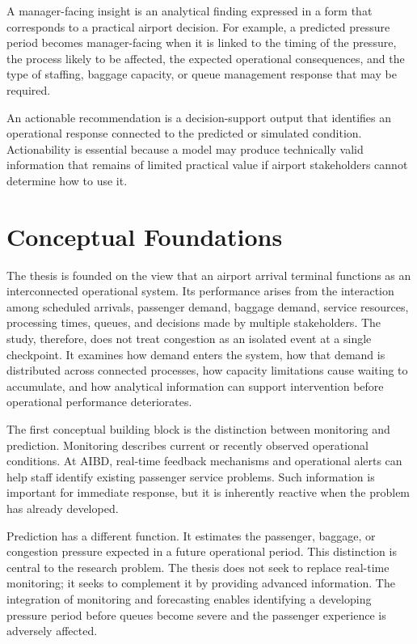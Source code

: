 A manager-facing insight is an analytical finding expressed in a form that corresponds to a practical airport decision. For example, a predicted pressure period becomes manager-facing when it is linked to the timing of the pressure, the process likely to be affected, the expected operational consequences, and the type of staffing, baggage capacity, or queue management response that may be required.

An actionable recommendation is a decision-support output that identifies an operational response connected to the predicted or simulated condition. Actionability is essential because a model may produce technically valid information that remains of limited practical value if airport stakeholders cannot determine how to use it.

\section{Conceptual Foundations}
\label{sec:conceptual-foundations}

The thesis is founded on the view that an airport arrival terminal functions as an interconnected operational system. Its performance arises from the interaction among scheduled arrivals, passenger demand, baggage demand, service resources, processing times, queues, and decisions made by multiple stakeholders. The study, therefore, does not treat congestion as an isolated event at a single checkpoint. It examines how demand enters the system, how that demand is distributed across connected processes, how capacity limitations cause waiting to accumulate, and how analytical information can support intervention before operational performance deteriorates.

The first conceptual building block is the distinction between monitoring and prediction. Monitoring describes current or recently observed operational conditions. At AIBD, real-time feedback mechanisms and operational alerts can help staff identify existing passenger service problems. Such information is important for immediate response, but it is inherently reactive when the problem has already developed.

Prediction has a different function. It estimates the passenger, baggage, or congestion pressure expected in a future operational period. This distinction is central to the research problem. The thesis does not seek to replace real-time monitoring; it seeks to complement it by providing advanced information. The integration of monitoring and forecasting enables identifying a developing pressure period before queues become severe and the passenger experience is adversely affected.

